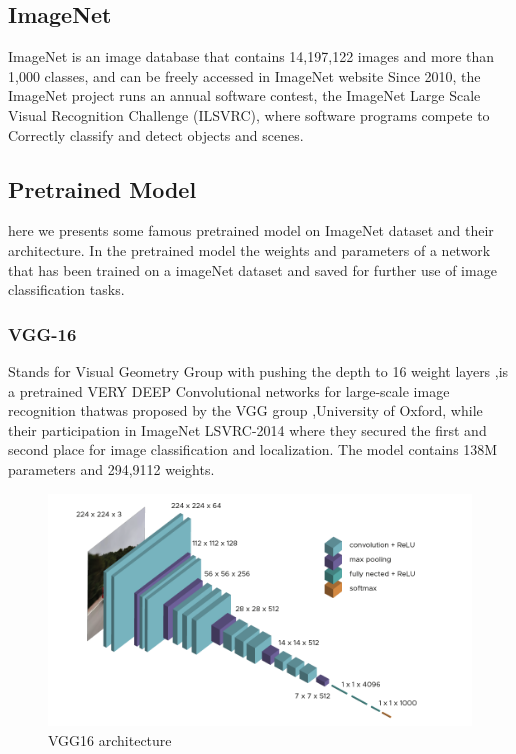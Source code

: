 \subsection{ImageNet}
ImageNet is an image database that contains 14,197,122 images and more than 1,000
classes, and can be freely accessed in ImageNet website \cite{art28}
Since 2010, the ImageNet project runs an annual software contest, the ImageNet Large Scale Visual Recognition Challenge (ILSVRC), where software programs compete to Correctly classify and detect objects and scenes.

\subsection{Pretrained Model}
here we presents some famous pretrained model on ImageNet dataset and
their architecture.
In the pretrained model the weights and parameters of a network that has been trained
on a imageNet dataset and saved for further use of image classification tasks.

\subsubsection{VGG-16}
Stands for Visual Geometry Group with pushing the depth to 16 weight layers ,is a
pretrained VERY DEEP Convolutional networks for large-scale image recognition thatwas proposed by the VGG group \cite{art30} ,University of Oxford, while their participation in
ImageNet LSVRC-2014 where they secured the first and second place for image classification
and localization. The model contains 138M parameters and 294,9112 weights.

\begin{figure}[!h]
    \centering
    \includegraphics[width=1\textwidth]{chapters/chapter02/fig02/vgg16.png}
    \caption{ VGG16 architecture}
    \label{fig:my_label}
\end{figure}
